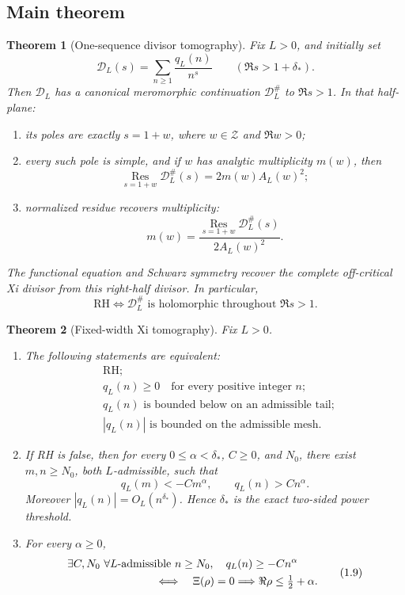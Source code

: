 \documentclass[11pt]{article}
\newtheorem{theorem}{Theorem}[section]
\newcommand{\cZ}{\mathcal Z}
\newcommand{\Res}{\operatorname*{Res}}
\begin{document}
\subsection{Main theorem}

\begin{theorem}[One-sequence divisor tomography]\label{thm:divisor-main}
Fix \(L>0\), and initially set
\[
 \mathcal D_L(s)=\sum_{n\ge1}\frac{q_L(n)}{n^s}
 \qquad(\Re s>1+\delta_*).
\]
Then \(\mathcal D_L\) has a canonical meromorphic continuation
\(\mathcal D_L^\#\) to \(\Re s>1\).  In that half-plane:
\begin{enumerate}[label=\textup{(\roman*)}]
\item its poles are exactly \(s=1+w\), where \(w\in\cZ\) and \(\Re w>0\);
\item every such pole is simple, and if \(w\) has analytic multiplicity \(m(w)\), then
\[
 \Res_{s=1+w}\mathcal D_L^\#(s)=2m(w)A_L(w)^2;
\]
\item normalized residue recovers multiplicity:
\[
 m(w)=\frac{\Res_{s=1+w}\mathcal D_L^\#(s)}{2A_L(w)^2}.
\]
\end{enumerate}
The functional equation and Schwarz symmetry recover the complete off-critical Xi divisor from
this right-half divisor.  In particular,
\[
 \mathrm{RH}
 \Longleftrightarrow
 \mathcal D_L^\#\text{ is holomorphic throughout }\Re s>1.
\]
\end{theorem}

\begin{theorem}[Fixed-width Xi tomography]\label{thm:main}
Fix \(L>0\).
\begin{enumerate}[label=\textup{(\roman*)}]
\item The following statements are equivalent:
\[
\begin{split}
 &\mathrm{RH};\\
 &q_L(n)\ge0\quad\text{for every positive integer }n;\\
 &q_L(n)\text{ is bounded below on an admissible tail};\\
 &|q_L(n)|\text{ is bounded on the admissible mesh}.
\end{split}
\tag{1.7}
\]
\item If RH is false, then for every \(0\le\alpha<\delta_*\), \(C\ge0\), and \(N_0\), there
exist \(m,n\ge N_0\), both \(L\)-admissible, such that
\[
 q_L(m)<-C m^\alpha,
 \qquad
 q_L(n)>C n^\alpha.
 \tag{1.8}
\]
Moreover \(|q_L(n)|=O_L(n^{\delta_*})\).  Hence \(\delta_*\) is the exact two-sided power
threshold.
\item For every \(\alpha\ge0\),
\[
\begin{split}
 &\exists C,N_0\ \forall L\text{-admissible }n\ge N_0,\quad
 q_L(n)\ge-Cn^\alpha\\
 &\hspace{28mm}\Longleftrightarrow\quad
 \Xi(\rho)=0\Longrightarrow \Re\rho\le\tfrac12+\alpha.
\end{split}
\tag{1.9}
\]
\end{enumerate}
\end{theorem}
\end{document}
